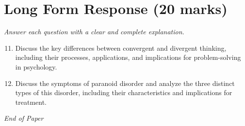 \documentclass[12pt]{article}
\begin{document}
\section*{Long Form Response (20 marks)}
\textit{Answer each question with a clear and complete explanation.}
\begin{enumerate}[label=\arabic*.]
\setcounter{enumi}{10}
\item Discuss the key differences between convergent and divergent thinking, including their processes, applications, and implications for problem-solving in psychology.
\item Discuss the symptoms of paranoid disorder and analyze the three distinct types of this disorder, including their characteristics and implications for treatment.
\end{enumerate}

\vfill
\noindent\textit{End of Paper}
\end{document}

